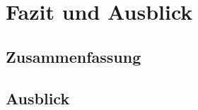 \chapter{Fazit und Ausblick}
\label{cap:Fazit}

\section{Zusammenfassung}
\label{sec:Zusammenfassung}

\section{Ausblick}
\label{sec:Ausblick}
